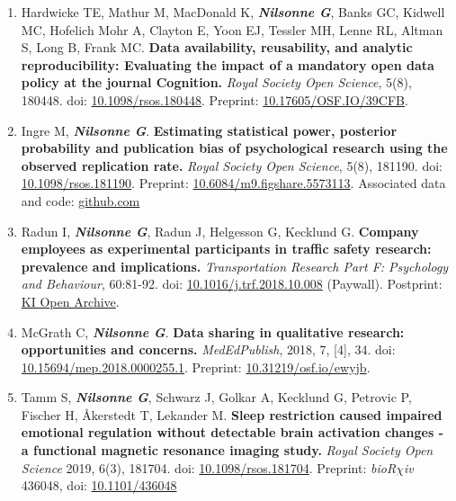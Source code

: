 \documentclass[10pt]{article}
\begin{document}
\begin{enumerate}[nolistsep]
doi: \href{http://doi.org/10.1525/collabra.158}{10.1525/collabra.158}. Preprint: \href{https://doi.org/10.17605/OSF.IO/RTYGM}{10.17605/OSF.IO/RTYGM}.
\item Hardwicke TE, Mathur M, MacDonald K, \textbf{\textit{Nilsonne G}}, Banks GC, Kidwell MC, Hofelich Mohr A, Clayton E, Yoon EJ, Tessler MH, Lenne RL, Altman S, Long B, Frank MC. \textbf{Data availability, reusability, and analytic reproducibility: Evaluating the impact of a mandatory open data policy at the journal Cognition.} \emph{Royal Society Open Science}, 5(8), 180448. doi: \href{https://doi.org/10.1098/rsos.180448}{10.1098/rsos.180448}. Preprint: \href{https://doi.org/10.17605/OSF.IO/39CFB}{10.17605/OSF.IO/39CFB}.
\item Ingre M, \textbf{\textit{Nilsonne G}}. \textbf{Estimating statistical power, posterior probability and publication bias of psychological research using the observed replication rate.} \emph{Royal Society Open Science}, 5(8), 181190. doi: \href{https://doi.org/10.1098/rsos.181190}{10.1098/rsos.181190}. Preprint: \href{https://doi.org/10.6084/m9.figshare.5573113}{10.6084/m9.figshare.5573113}.
Associated data and code: \href{https://github.com/micing/publication_bias_psychology}{github.com}
\item Radun I, \textbf{\textit{Nilsonne G}}, Radun J, Helgesson G, Kecklund G. \textbf{Company employees as experimental participants in traffic safety research: prevalence and implications.} \emph{Transportation Research Part F: Psychology and Behaviour}, 60:81-92. doi: \href{https://doi.org/10.1016/j.trf.2018.10.008}{10.1016/j.trf.2018.10.008} (Paywall). Postprint: \href{http://hdl.handle.net/10616/46553}{KI Open Archive}.
\item McGrath C, \textbf{\textit{Nilsonne G}}. \textbf{Data sharing in qualitative research: opportunities and concerns.} 
\emph{MedEdPublish}, 2018, 7, [4], 34. doi: \href{https://doi.org/10.15694/mep.2018.0000255.1}{10.15694/mep.2018.0000255.1}. 
Preprint: \href{https://doi.org/10.31219/osf.io/ewyjb}{10.31219/osf.io/ewyjb}.
\item Tamm S, \textbf{\textit{Nilsonne G}}, Schwarz J, Golkar A, Kecklund G, Petrovic P, Fischer H, Åkerstedt T, Lekander M. \textbf{Sleep restriction caused impaired emotional regulation without detectable brain activation changes - a functional magnetic resonance imaging study.} \emph{Royal Society Open Science} 2019, 6(3), 181704. doi: \href{http://doi.org/10.1098/rsos.181704}{10.1098/rsos.181704}. Preprint: \textit{bioR$\chi$iv} 436048, doi: \href{http://doi.org/10.1101/436048}{10.1101/436048}

\end{enumerate}
\end{document}
